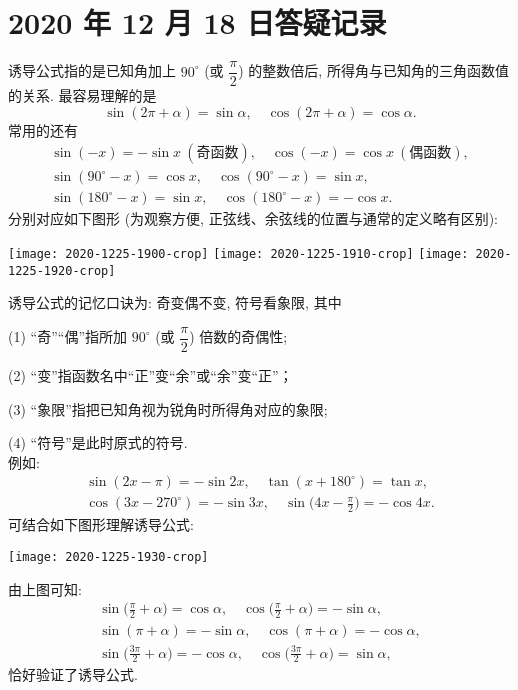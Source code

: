 \section{2020 年 12 月 18 日答疑记录}

  诱导公式指的是已知角加上 $90^\circ$ (或 $\dfrac{\pi}2$) 的整数倍后,
  所得角与已知角的三角函数值的关系. 最容易理解的是
  \[\sin(2\pi+\alpha)= \sin\alpha,\quad
        \cos(2\pi+\alpha)= \cos\alpha.\]
  常用的还有
  \[\begin{gathered}
    \sin(-x)= -\sin x\ (\text{奇函数}),\quad 
        \cos(-x)= \cos x\ (\text{偶函数}),\\
    \sin(90^\circ-x)= \cos x,\quad \cos(90^\circ-x)= \sin x,\\
    \sin(180^\circ-x)= \sin x,\quad \cos(180^\circ-x)= -\cos x.
  \end{gathered}\]
  分别对应如下图形 (为观察方便, 正弦线、余弦线的位置与通常的定义略有区别):
    \begin{center}
        \texttt{[image: 2020-1225-1900-crop]}\quad
        \texttt{[image: 2020-1225-1910-crop]}\quad
        \texttt{[image: 2020-1225-1920-crop]}
    \end{center}
  
  诱导公式的记忆口诀为: 奇变偶不变, 符号看象限, 其中
  
  (1) “奇”“偶”指所加 $90^\circ$ (或 $\dfrac{\pi}2$) 倍数的奇偶性; 
  
  (2) “变”指函数名中“正”变“余”或“余”变“正”；
  
  (3) “象限”指把已知角视为锐角时所得角对应的象限;
   
  (4) “符号”是此时原式的符号. \\
  例如:
  \begin{gather*}
    \sin(2x-\pi)= -\sin2x,\quad \tan(x+180^\circ)= \tan x, \\
    \cos(3x-270^\circ)= -\sin 3x,\quad
    \sin\Big(4x-\frac{\pi}2\Big)= -\cos 4x.
  \end{gather*}
    可结合如下图形理解诱导公式:
    \begin{center}
        \texttt{[image: 2020-1225-1930-crop]}
    \end{center}
    
    由上图可知:
    \[\begin{gathered}
        \sin\biggl(\frac\pi2+\alpha\biggr)= \cos\alpha,\quad
            \cos\biggl(\frac\pi2+\alpha\biggr)= -\sin\alpha,\\
        \sin(\pi+\alpha)= -\sin\alpha,\quad
            \cos(\pi+\alpha)= -\cos\alpha,\\
        \sin\biggl(\frac{3\pi}2+\alpha\biggr)= -\cos\alpha,\quad
            \cos\biggl(\frac{3\pi}2+\alpha\biggr)= \sin\alpha,
    \end{gathered}\]
    恰好验证了诱导公式.
    
